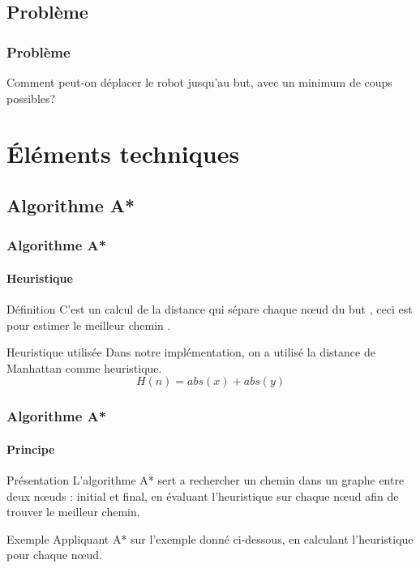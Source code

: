 \documentclass[t]{beamer}
\begin{document}
\subsection{Problème}
\begin{frame}
\frametitle{Problème}
\begin{center} 
Comment peut-on déplacer le robot jusqu'au but, avec un minimum de coups possibles?
\end{center}
\end{frame}



\section{Éléments techniques}
\subsection{Algorithme A*}
\begin{frame}
\frametitle{Algorithme A*}
\framesubtitle{Heuristique}
\begin{block}{Définition}
C'est un calcul de la distance qui sépare chaque nœud du but , ceci est pour estimer le meilleur chemin .
\end{block}
\begin{block}{Heuristique utilisée }
Dans notre implémentation, on a utilisé la distance de Manhattan comme heuristique. 
\begin{equation}H(n) = abs(x) + abs(y)\end{equation}
\end{block}
\end{frame}

\begin{frame}
\frametitle{Algorithme A*}
\framesubtitle{Principe}
\begin{block}{Présentation}
L'algorithme A* sert a rechercher un chemin dans un graphe entre deux nœuds : initial et final, en évaluant l'heuristique sur chaque nœud afin de trouver le meilleur chemin.
\end{block}
\begin{exampleblock}{Exemple } 
Appliquant A* sur l'exemple donné ci-dessous, en calculant l'heuristique pour chaque nœud.
\end{exampleblock}
\end{frame}
\end{document}
